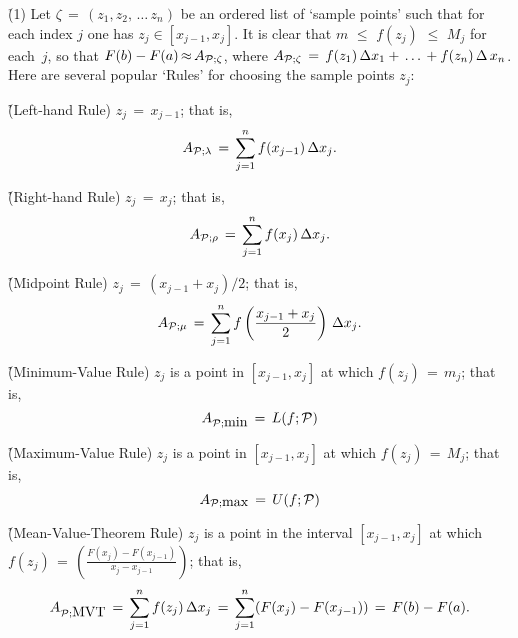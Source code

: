 \V

        \h (1) Let ${\zeta} \,=\, (z_{1}, z_{2},\,{\ldots}\,z_{n})$ be an ordered list of `sample points'
    such that for each index $j$ one has $z_{j}{\in}[x_{j-1},x_{j}]$. It is clear that $m\,\,{\leq}\,\,f(z_{j})\,\,{\leq}\,\,M_{j}$ for each~$j$, so that
    $F(b) - F(a) \,{\approx}\, A_{{\cal P};{\zeta}}$, where $A_{{\cal P}; {\zeta}} \,=\, f(z_{1})\,{\Delta}x_{1} + \,{\ldots}\, + f(z_{n})\,{\Delta}\,x_{n}$.
    Here are several popular `Rules' for choosing the sample points $z_{j}$:

\VA

        \h \h (Left-hand Rule) $z_{j} \,=\, x_{j-1}$; that is,
        \begin{displaymath}
        A_{{\cal P}; {\lambda}} \,=\, \sum_{j=1}^{n} f(x_{j-1})\,{\Delta}x_{j}.
        \end{displaymath}

        \h \h (Right-hand Rule) $z_{j} \,=\, x_{j}$; that is,
        \begin{displaymath}
        A_{{\cal P}; {\rho}} \,=\, \sum_{j=1}^{n} f(x_{j})\,{\Delta}x_{j}.
        \end{displaymath}

        \h \h (Midpoint Rule) $z_{j} \,=\, (x_{j-1}+x_{j})/2$; that is,
        \begin{displaymath}
        A_{{\cal P}; {\mu}} \,=\, \sum_{j=1}^{n} f\left(\frac{x_{j-1}+x_{j}}{2}\right)\,{\Delta}x_{j}.
        \end{displaymath}

        \h \h (Minimum-Value Rule) $z_{j}$ is a point in $[x_{j-1},x_{j}]$ at which $f(z_{j}) \,=\, m_{j}$; that is,
        \begin{displaymath}
        A_{{\cal P}; \mbox{min}} \,=\, L(f;{\cal P})
        \end{displaymath}

        \h \h (Maximum-Value Rule) $z_{j}$ is a point in $[x_{j-1},x_{j}]$ at which $f(z_{j}) \,=\, M_{j}$; that is,
        \begin{displaymath}
        A_{{\cal P}; \mbox{max}} \,=\, U(f;{\cal P})
        \end{displaymath}

        \h \h (Mean-Value-Theorem Rule) $z_{j}$ is a point in the interval $[x_{j-1},x_{j}]$ at which
    $f(z_{j}) \,=\, {\displaystyle \left(\frac{F(x_{j})-F(x_{j-1})}{x_{j}-x_{j-1}}\right)}$; that is,
        \begin{displaymath}
        A_{{\cal P}; \mbox{MVT}} \,=\, \sum_{j=1}^{n} f(z_{j})\,{\Delta}x_{j} \,=\, 
        \sum_{j=1}^{n} (F(x_{j})-F(x_{j-1})) \,=\, F(b) - F(a).
        \end{displaymath}

